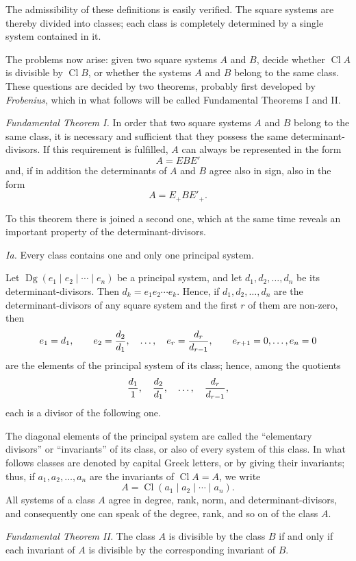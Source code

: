 \documentclass[11pt,a4paper]{article}
\newcommand{\Cl}{\operatorname{Cl}}
\newcommand{\Dg}{\operatorname{Dg}}
\begin{document}
The admissibility of these definitions is easily verified. The square systems are thereby divided into classes; each class is completely determined by a single system contained in it.

The problems now arise: given two square systems $A$ and $B$, decide whether $\Cl A$ is divisible by $\Cl B$, or whether the systems $A$ and $B$ belong to the same class. These questions are decided by two theorems, probably first developed by \emph{Frobenius}, which in what follows will be called Fundamental Theorems I and II.

\emph{Fundamental Theorem I.} In order that two square systems $A$ and $B$ belong to the same class, it is necessary and sufficient that they possess the same determinant-divisors. If this requirement is fulfilled, $A$ can always be represented in the form
\[
 A=EBE'
\]
and, if in addition the determinants of $A$ and $B$ agree also in sign, also in the form
\[
 A=E_+BE'_+.
\]

To this theorem there is joined a second one, which at the same time reveals an important property of the determinant-divisors.

\emph{Ia.} Every class contains one and only one principal system.

Let $\Dg(e_1\mid e_2\mid\cdots\mid e_n)$ be a principal system, and let $d_1,d_2,\ldots,d_n$ be its determinant-divisors. Then $d_k=e_1e_2\cdots e_k$. Hence, if $d_1,d_2,\ldots,d_n$ are the determinant-divisors of any square system and the first $r$ of them are non-zero, then
\[
 e_1=d_1,
 \qquad e_2={d_2\over d_1},
 \quad \ldots,\quad
 e_r={d_r\over d_{r-1}},
 \qquad e_{r+1}=0,\ldots,e_n=0
\]
are the elements of the principal system of its class; hence, among the quotients
\[
 {d_1\over 1},\quad {d_2\over d_1},\quad \ldots,\quad {d_r\over d_{r-1}},
\]
each is a divisor of the following one.

The diagonal elements of the principal system are called the ``elementary divisors'' or ``invariants'' of its class, or also of every system of this class. In what follows classes are denoted by capital Greek letters, or by giving their invariants; thus, if $a_1,a_2,\ldots,a_n$ are the invariants of $\Cl A=A$, we write
\[
 A=\Cl(a_1\mid a_2\mid\cdots\mid a_n).
\]
All systems of a class $A$ agree in degree, rank, norm, and determinant-divisors, and consequently one can speak of the degree, rank, and so on of the class $A$.

\emph{Fundamental Theorem II.} The class $A$ is divisible by the class $B$ if and only if each invariant of $A$ is divisible by the corresponding invariant of $B$.
\end{document}
